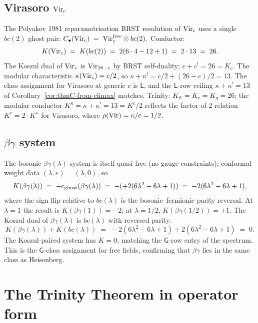 \subsection{Virasoro \(\mathrm{Vir}_{c}\)}
\label{subsec:verify-virasoro}

The Polyakov 1981 reparametrisation BRST resolution of \(\mathrm{Vir}_{c}\)
uses a single \(bc(2)\) ghost pair:
\(
  C_{\bullet}(\mathrm{Vir}_{c}) \;=\; \mathrm{Vir}_{c}^{\mathrm{free}} \otimes bc(2).
\)
Conductor:
\[
  K(\mathrm{Vir}_{c}) \;=\; K(bc(2)) \;=\; 2(6 \cdot 4 - 12 + 1) \;=\; 2 \cdot 13 \;=\; 26.
\]
The Koszul dual of \(\mathrm{Vir}_{c}\) is \(\mathrm{Vir}_{26-c}\) by BRST
self-duality; \(c + c^{!} = 26 = K_{c}\). The modular characteristic
\(\kappa(\mathrm{Vir}_{c}) = c/2\), so
\(\kappa + \kappa^{!} = c/2 + (26-c)/2 = 13\). The class assignment
for Virasoro at generic \(c\) is \(\mathsf{L}\), and the
\(\mathsf{L}\)-row ceiling
\(\kappa + \kappa^{!} = 13\) of Corollary~\ref{cor:thmC-from-climax}
matches. Trinity: \(K_{E} = K_{c} = K_{g} = 26\); the modular conductor
\(K^{\kappa} = \kappa + \kappa^{!} = 13 = K^{c}/2\) reflects the
factor-of-2 relation \(K^{c} = 2 \cdot K^{\kappa}\) for Virasoro, where
\(\rho(\mathrm{Vir}) = \kappa/c = 1/2\).

\subsection{\(\beta\gamma\) system}
\label{subsec:verify-betagamma}

The bosonic \(\beta\gamma(\lambda)\) system is itself quasi-free
(no gauge constraints); conformal-weight data
\((\lambda, \varepsilon) = (\lambda, 0)\), so
\[
  K(\beta\gamma(\lambda)) \;=\; -c_{\mathrm{ghost}}(\beta\gamma(\lambda))
  \;=\; -(+2(6\lambda^{2}-6\lambda+1))
  \;=\; -2(6\lambda^{2}-6\lambda+1),
\]
where the sign flip relative to \(bc(\lambda)\) is the bosonic--fermionic
parity reversal. At \(\lambda = 1\) the result is \(K(\beta\gamma(1)) = -2\);
at \(\lambda = 1/2\), \(K(\beta\gamma(1/2)) = +1\). The Koszul dual of
\(\beta\gamma(\lambda)\) is \(bc(\lambda)\) with reversed parity:
\[
  K(\beta\gamma(\lambda)) + K(bc(\lambda))
  \;=\; -2(6\lambda^{2}-6\lambda+1) + 2(6\lambda^{2}-6\lambda+1)
  \;=\; 0.
\]
The Koszul-paired system has \(K = 0\), matching the \(\mathsf{G}\)-row
entry of the spectrum. This is the \(\mathsf{G}\)-class assignment for
free fields, confirming that \(\beta\gamma\) lies in the same class as
Heisenberg.

\section{The Trinity Theorem in operator form}
\label{sec:climax-trinity-operators}

